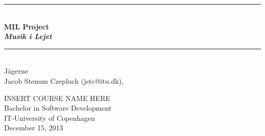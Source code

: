 \documentclass[a4paper,11pt]{article}
\begin{document}
\begin{titlepage}
\centering \parindent=0pt
\newcommand{\HRule}{\rule{\textwidth}{1mm}}
 \HRule\\[1cm]\Huge\bfseries
MIL Project\\\emph{Musik i Lejet}\\[0.7cm]
\HRule\\[4cm]  \large  Jägerne
\\Jacob Stenum Czepluch (jstc@itu.dk), \\

 \normalsize %
\thispagestyle{empty}
\begin{flushleft}
INSERT COURSE NAME HERE \\
Bachelor in Software Development\\
IT-University of Copenhagen\\
December 15, 2013 \end{flushleft}
\end{titlepage}

\tableofcontents
\pagebreak

\pagebreak





%

%
\end{document}
